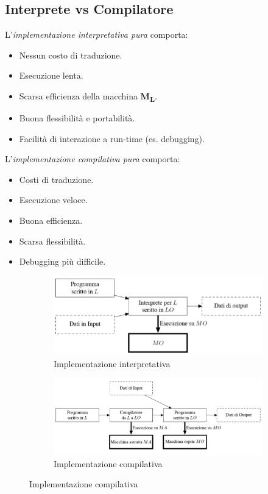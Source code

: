 \documentclass[a4paper,oneside,titlepage]{book}
\begin{document}
\subsection{Interprete vs Compilatore}
L'\textit{implementazione interpretativa pura} comporta:
\begin{itemize}
	\item Nessun costo di traduzione.
	\item Esecuzione lenta.
	\item Scarsa efficienza della macchina \textbf{M\textsubscript{L}}.
	\item Buona flessibilità e portabilità.
	\item Facilità di interazione a run-time (es. debugging).
\end{itemize}
L'\textit{implementazione compilativa pura} comporta:
\begin{itemize}
	\item Costi di traduzione.
	\item Esecuzione veloce.
	\item Buona efficienza.
	\item Scarsa flessibilità.
	\item Debugging più difficile.
\end{itemize}
\begin{figure}[htp]
	\begin{subfigure}{0.49\textwidth}
		\includegraphics[width=\textwidth, height=\textheight, keepaspectratio]{int.png} 
		\caption{Implementazione interpretativa}
	\end{subfigure}
	\hfill
	\begin{subfigure}{0.49\textwidth}
		\includegraphics[width=\textwidth, height=\textheight, keepaspectratio]{comp.png}
		\caption{Implementazione compilativa}
	\end{subfigure}
\end{figure}
\end{document}
